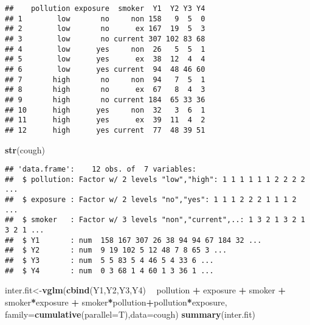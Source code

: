 \documentclass[]{article}
\newenvironment{Shaded}{\begin{snugshade}}{\end{snugshade}}
\newcommand{\KeywordTok}[1]{\textcolor[rgb]{0.13,0.29,0.53}{\textbf{#1}}}
\newcommand{\DataTypeTok}[1]{\textcolor[rgb]{0.13,0.29,0.53}{#1}}
\newcommand{\StringTok}[1]{\textcolor[rgb]{0.31,0.60,0.02}{#1}}
\newcommand{\OperatorTok}[1]{\textcolor[rgb]{0.81,0.36,0.00}{\textbf{#1}}}
\newcommand{\NormalTok}[1]{#1}
\begin{document}
\begin{verbatim}
##    pollution exposure  smoker  Y1  Y2 Y3 Y4
## 1        low       no     non 158   9  5  0
## 2        low       no      ex 167  19  5  3
## 3        low       no current 307 102 83 68
## 4        low      yes     non  26   5  5  1
## 5        low      yes      ex  38  12  4  4
## 6        low      yes current  94  48 46 60
## 7       high       no     non  94   7  5  1
## 8       high       no      ex  67   8  4  3
## 9       high       no current 184  65 33 36
## 10      high      yes     non  32   3  6  1
## 11      high      yes      ex  39  11  4  2
## 12      high      yes current  77  48 39 51
\end{verbatim}

\begin{Shaded}
\begin{Highlighting}[]
\KeywordTok{str}\NormalTok{(cough)}
\end{Highlighting}
\end{Shaded}

\begin{verbatim}
## 'data.frame':    12 obs. of  7 variables:
##  $ pollution: Factor w/ 2 levels "low","high": 1 1 1 1 1 1 2 2 2 2 ...
##  $ exposure : Factor w/ 2 levels "no","yes": 1 1 1 2 2 2 1 1 1 2 ...
##  $ smoker   : Factor w/ 3 levels "non","current",..: 1 3 2 1 3 2 1 3 2 1 ...
##  $ Y1       : num  158 167 307 26 38 94 94 67 184 32 ...
##  $ Y2       : num  9 19 102 5 12 48 7 8 65 3 ...
##  $ Y3       : num  5 5 83 5 4 46 5 4 33 6 ...
##  $ Y4       : num  0 3 68 1 4 60 1 3 36 1 ...
\end{verbatim}

\begin{Shaded}
\begin{Highlighting}[]
\NormalTok{inter.fit<-}\KeywordTok{vglm}\NormalTok{(}\KeywordTok{cbind}\NormalTok{(Y1,Y2,Y3,Y4) }\OperatorTok{~}\StringTok{ }\NormalTok{pollution }\OperatorTok{+}\StringTok{ }\NormalTok{exposure }\OperatorTok{+}\StringTok{ }\NormalTok{smoker }\OperatorTok{+}\StringTok{ }\NormalTok{smoker}\OperatorTok{*}\NormalTok{exposure }\OperatorTok{+}\StringTok{ }
\StringTok{    }\NormalTok{smoker}\OperatorTok{*}\NormalTok{pollution}\OperatorTok{+}\NormalTok{pollution}\OperatorTok{*}\NormalTok{exposure,    }\DataTypeTok{family=}\KeywordTok{cumulative}\NormalTok{(}\DataTypeTok{parallel=}\NormalTok{T),}\DataTypeTok{data=}\NormalTok{cough)}
\KeywordTok{summary}\NormalTok{(inter.fit)}
\end{Highlighting}
\end{Shaded}
\end{document}
